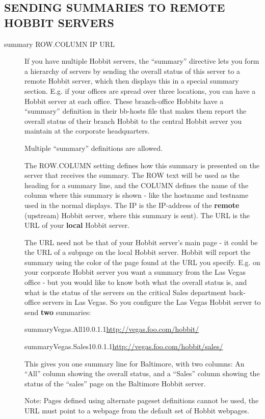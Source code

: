  
\subsection{SENDING SUMMARIES TO REMOTE HOBBIT SERVERS}
\begin{description}
\item[summary ROW.COLUMN IP URL] If you have multiple Hobbit servers,
  the ``summary'' directive lets you form a hierarchy of servers by
  sending the overall status of this server to a remote Hobbit server,
  which then displays this in a special summary section. E.g. if your
  offices are spread over three locations, you can have a Hobbit
  server at each office. These branch-office Hobbits have a
  ``summary'' definition in their bb-hosts file that makes them report
  the overall status of their branch Hobbit to the central Hobbit
  server you maintain at the corporate headquarters. 


  Multiple ``summary'' definitions are allowed. 


  The ROW.COLUMN setting defines how this summary is presented on the
  server that receives the summary. The ROW text will be used as the
  heading for a summary line, and the COLUMN defines the name of the
  column where this summary is shown - like the hostname and testname
  used in the normal displays. The IP is the IP-address of the
  \textbf{remote} (upstream) Hobbit server, where this summary is
  sent). The URL is the URL of your \textbf{local} Hobbit server. 



  The URL need not be that of your Hobbit server's main page - it
  could be the URL of a subpage on the local Hobbit server. Hobbit
  will report the summary using the color of the page found at the URL
  you specify. E.g. on your corporate Hobbit server you want a summary
  from the Las Vegas office - but you would like to know both what the
  overall status is, and what is the status of the servers on the
  critical Sales department back-office servers in Las Vegas. So you
  configure the Las Vegas Hobbit server to send \textbf{two}
  summaries: 





  
summaryVegas.All10.0.1.1\url{http://vegas.foo.com/hobbit/} 
 
summaryVegas.Sales10.0.1.1\url{http://vegas.foo.com/hobbit/sales/}


 


  This gives you one summary line for Baltimore, with two columns: An
  ``All'' column showing the overall status, and a ``Sales'' column
  showing the status of the ``sales'' page on the Baltimore Hobbit
  server. 



  Note: Pages defined using alternate pageset definitions cannot be
  used, the URL must point to a webpage from the default set of Hobbit
  webpages. 



 


\end{description}

